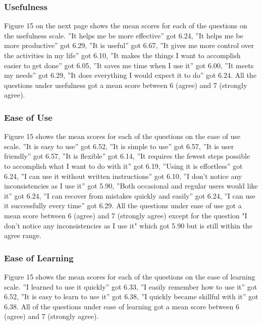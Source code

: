 \documentclass{icsthesis}
\begin{document}
\begin{mainmatter}
		\subsubsection{Usefulness}
		Figure 15 on the next page shows the mean scores for each of the questions on the usefulness scale.
		”It helps me be more effective” got 6.24, ”It helps me be more productive” got 6.29, ”It is useful” got 6.67, ”It gives me more control over the activities in my life” got 6.10, ”It makes the things I want to accomplish easier to get done” got 6.05, ”It saves me time when I use it” got 6.00, ”It meets my needs” got 6.29, ”It does everything I would expect it to do” got 6.24.
		All the questions under usefulness got a mean score between 6 (agree) and 7 (strongly agree).
		\subsubsection{Ease of Use}
		Figure 15 shows the mean scores for each of the questions on the ease of use scale. ”It is easy to use” got 6.52, ”It is simple to use” got 6.57, ”It is user friendly” got 6.57, ”It is flexible” got 6.14, ”It requires the fewest steps possible to accomplish what I want to do with it” got 6.19, ”Using it is effortless” got 6.24, ”I can use it without written instructions” got 6.10, ”I don’t notice any inconsistencies as I use it” got 5.90, ”Both occasional and regular users would like it” got 6.24, ”I can recover from mistakes quickly and easily” got 6.24, ”I can use it successfully every time” got 6.29.
		All the questions under ease of use got a mean score between 6 (agree) and 7 (strongly agree) except for the question "I don't notice any inconsistencies as I use it" which got 5.90 but is still within the agree range.
		\subsubsection{Ease of Learning}
		Figure 15 shows the mean scores for each of the questions on the ease of learning scale. ”I learned to use it quickly” got 6.33, ”I easily remember how to use it” got 6.52, ”It is easy to learn to use it” got 6.38, ”I quickly became skillful with it” got 6.38.
		All of the questions under ease of learning got a mean score between 6 (agree) and 7 (strongly agree).

\end{mainmatter}
\end{document}
